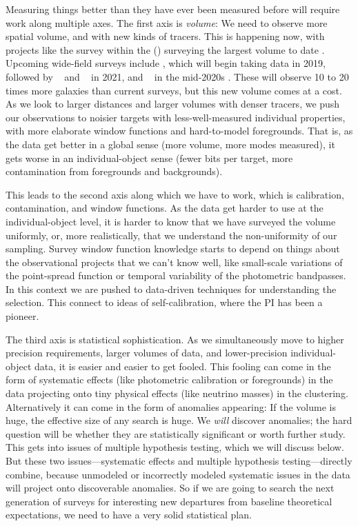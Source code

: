 \documentclass[12pt, fullpage, letterpaper]{article}
\begin{document}
Measuring things better than they have ever been measured before will require work along
multiple axes.
The first axis is \emph{volume}: We need to observe more spatial volume, and with new kinds
of tracers.
This is happening now, with projects like the
 survey within the  (\SDSS) surveying the largest volume to date
\citep{Dawson2015}.
Upcoming wide-field surveys include 
\citep{Aghamousa2016}, which will begin taking data in 2019, followed
by \NASA\  \citep{Amiaux2012} and
\LSST\ \citep{Ivezic2018} in 2021, and \NASA\  in the mid-2020s
\citep{Akeson2019}.
These will observe 10 to 20 times more galaxies than current surveys,
but this new volume comes at a cost. As we look to larger
distances and larger volumes with denser tracers, we push our
observations to noisier targets with less-well-measured individual
properties, with more elaborate window functions and hard-to-model foregrounds.
That is, as the data get better in a global sense (more volume, more
modes measured), it gets worse in an individual-object sense (fewer
bits per target, more contamination from foregrounds and backgrounds).

This leads to the second axis along which we have to work, which
is calibration, contamination, and window functions.
As the data get harder to use at the individual-object level, it is
harder to know that we have surveyed the volume uniformly, or, more
realistically, that we understand the non-uniformity of our sampling.
Survey window function knowledge starts to depend on things about the
observational projects that we can't know well, like small-scale
variations of the point-spread function or temporal variability of the
photometric bandpasses.
In this context we are pushed to data-driven techniques for
understanding the selection.
This connect to ideas of
self-calibration, where the PI has been a pioneer.

The third axis is statistical sophistication.
As we simultaneously move to higher precision requirements, larger
volumes of data, and lower-precision individual-object data, it is 
easier and easier to get fooled.
This fooling can come in the form of systematic effects (like
photometric calibration or foregrounds) in the data projecting onto
tiny physical effects (like neutrino masses) in the clustering.
Alternatively it can come in the form of anomalies appearing: If the volume is
huge, the effective size of any search is huge.
We \emph{will} discover anomalies; the hard question will be whether
they are statistically significant or worth further study.
This gets into issues of multiple hypothesis testing, which we will
discuss below.
But these two issues---systematic effects and multiple hypothesis
testing---directly combine, because unmodeled or incorrectly modeled
systematic issues in the data will project onto discoverable
anomalies.
So if we are going to search the next generation of surveys for
interesting new departures from baseline theoretical expectations,
we need to have a very solid statistical plan.
\end{document}
